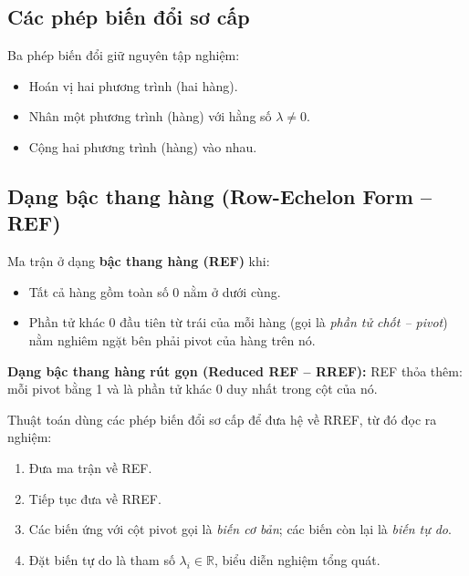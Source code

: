 \documentclass[12pt,a4paper]{article}
\begin{document}
\subsection{Các phép biến đổi sơ cấp}

Ba phép biến đổi giữ nguyên tập nghiệm:
\begin{itemize}
  \item Hoán vị hai phương trình (hai hàng).
  \item Nhân một phương trình (hàng) với hằng số $\lambda \ne 0$.
  \item Cộng hai phương trình (hàng) vào nhau.
\end{itemize}

\subsection{Dạng bậc thang hàng (Row-Echelon Form -- REF)}

\begin{dinhnghia}
Ma trận ở dạng \textbf{bậc thang hàng (REF)} khi:
\begin{itemize}
  \item Tất cả hàng gồm toàn số 0 nằm ở dưới cùng.
  \item Phần tử khác 0 đầu tiên từ trái của mỗi hàng (gọi là \emph{phần tử chốt -- pivot}) nằm nghiêm ngặt bên phải pivot của hàng trên nó.
\end{itemize}
\end{dinhnghia}

\begin{dinhnghia}
\textbf{Dạng bậc thang hàng rút gọn (Reduced REF -- RREF):} REF thỏa thêm: mỗi pivot bằng 1 và là phần tử khác 0 duy nhất trong cột của nó.
\end{dinhnghia}

\begin{phuongphap}[title={Khử Gauss (Gaussian Elimination)}]
Thuật toán dùng các phép biến đổi sơ cấp để đưa hệ về RREF, từ đó đọc ra nghiệm:
\begin{enumerate}
  \item Đưa ma trận về REF.
  \item Tiếp tục đưa về RREF.
  \item Các biến ứng với cột pivot gọi là \emph{biến cơ bản}; các biến còn lại là \emph{biến tự do}.
  \item Đặt biến tự do là tham số $\lambda_i \in \mathbb{R}$, biểu diễn nghiệm tổng quát.
\end{enumerate}
\end{phuongphap}
\end{document}
